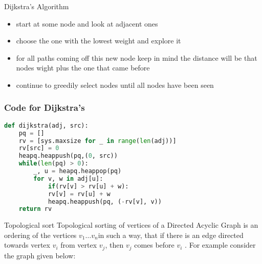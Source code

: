 \documentclass{beamer}
\begin{document}
  
\begin{frame}{Dijkstra's Algorithm}
    \begin{itemize}
        \item start at some node and look at adjacent ones
        \item choose the one with the lowest weight and explore it
        \item for all paths coming off this new node keep in mind the distance will be that nodes wight plus the one that came before
        \item continue to greedily select nodes until all nodes have been seen
    \end{itemize}
\end{frame}
\begin{frame}[fragile]
    \frametitle{Code for Dijkstra's}
             \begin{lstlisting}[language=Python]
def dijkstra(adj, src):
    pq = []
    rv = [sys.maxsize for _ in range(len(adj))]
    rv[src] = 0
    heapq.heappush(pq,(0, src))
    while(len(pq) > 0):
    	_, u = heapq.heappop(pq)
    	for v, w in adj[u]:
    		if(rv[v] > rv[u] + w):
    		rv[v] = rv[u] + w
    		heapq.heappush(pq, (-rv[v], v))
    return rv
  \end{lstlisting}
    \end{frame}
  
 \begin{frame}{Topological sort}
     Topological sorting of vertices of a Directed Acyclic Graph is an ordering of the vertices $v_1 \dots v_n$in such a way, that if there is an edge directed towards vertex $v_i$ from vertex $v_j$, then $v_j$ comes before $v_i$ . For example consider the graph given below:
     
     \vspace{0.5cm}
 \end{frame} 
 
\end{document}
